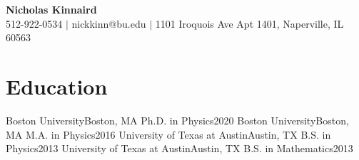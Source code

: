\newcommand{\shorterSection}[1]{\vspace{-10pt}\section{#1}}



\begin{center}
  \textbf{{\huge Nicholas Kinnaird}} \\
  \small 512-922-0534 $\vert$ nickkinn@bu.edu $\vert$ 1101 Iroquois Ave Apt 1401, Naperville, IL 60563
\end{center}

\shorterSection{Education}
  \resumeSubHeadingListStart
    \resumeSubheading
      {Boston University}{Boston, MA}
      {Ph.D. in Physics}{2020}{
    }
    \resumeSubheading
      {Boston University}{Boston, MA}
      {M.A. in Physics}{2016}{
    }
    \resumeSubheading
      {University of Texas at Austin}{Austin, TX}
      {B.S. in Physics}{2013}
    \resumeSubheading
      {University of Texas at Austin}{Austin, TX}
      {B.S. in Mathematics}{2013}{}
  \resumeSubHeadingListEnd


